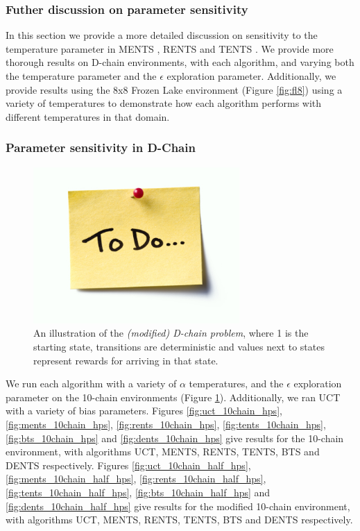     

    
    \subsubsection{Futher discussion on parameter sensitivity} \label{app:param_sens}
        In this section we provide a more detailed discussion on sensitivity to the temperature parameter in MENTS %
        , RENTS and TENTS %
        . We provide more thorough results on D-chain environments, with each algorithm, and varying both the temperature parameter and the $\epsilon$ exploration parameter. Additionally, we provide results using the 8x8 Frozen Lake environment (Figure \ref{fig:fl8}) using a variety of temperatures to demonstrate how each algorithm performs with different temperatures in that domain.


        \subsubsection{Parameter sensitivity in D-Chain} \label{app:param_sens_dchain}
            
            \begin{figure}
                \centering
                \includegraphics[width=0.7\textwidth]{figures/todo.jpg}
                \caption{An illustration of the \textit{(modified) D-chain problem}, where 1 is the starting state, transitions are deterministic and values next to states represent rewards for arriving in that state.}
                \label{fig:dchain_illustration_2}
            \end{figure}

            We run each algorithm with a variety of $\alpha$ temperatures, and the $\epsilon$ exploration parameter on the 10-chain environments (Figure \ref{fig:dchain_illustration_2}). Additionally, we ran UCT with a variety of bias parameters. Figures \ref{fig:uct_10chain_hps}, \ref{fig:ments_10chain_hps}, \ref{fig:rents_10chain_hps}, \ref{fig:tents_10chain_hps}, \ref{fig:bts_10chain_hps} and \ref{fig:dents_10chain_hps} give results for the 10-chain environment, with algorithms UCT, MENTS, RENTS, TENTS, BTS and DENTS respectively. Figures \ref{fig:uct_10chain_half_hps}, \ref{fig:ments_10chain_half_hps}, \ref{fig:rents_10chain_half_hps}, \ref{fig:tents_10chain_half_hps}, \ref{fig:bts_10chain_half_hps} and \ref{fig:dents_10chain_half_hps} give results for the modified 10-chain environment, with algorithms UCT, MENTS, RENTS, TENTS, BTS and DENTS respectively. 

